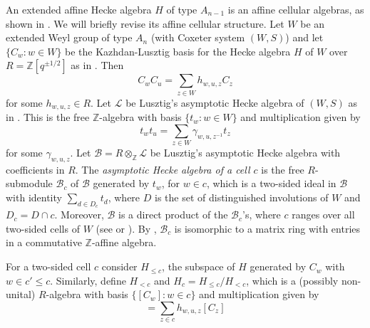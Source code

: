 \documentclass[oneside, a4paper, 11pt]{amsart}
\newcommand{\Z}{\mathbb{Z}}
\newcommand{\cB}{\mathcal{B}}
\newcommand\Warning{%
 \makebox[1.4em][c]{%
 \makebox[0pt][c]{\raisebox{.1em}{\small!}}%
 \makebox[0pt][c]{\color{red}\Large$\bigtriangleup$}}}%
\newcommand{\warning}[1]{{\Warning {\textbf{#1}}}}
\begin{document}
An extended affine Hecke algebra $H$ of type $A_{n-1}$ is an affine cellular algebras, as shown in 
\cite[Section 5]{KXaffine}. 
 We will briefly revise its affine cellular structure. Let $W$ be an extended Weyl group of type $A_n$ (with Coxeter system $(W,S)$) and let $\{C_w:w\in W\}$ be the Kazhdan-Lusztig basis for the Hecke algebra $H$ of $W$ over $R=\Z[q^{\pm 1/2}]$ as in \cite{KazhdanLusztig}. Then 
\begin{equation}
C_wC_u=\sum_{z\in W}h_{w,u,z}C_z
\end{equation}
for some $h_{w,u,z}\in R$.  Let ${\mathcal L}$ be Lusztig's asymptotic Hecke algebra of $(W,S)$ as in \cite{Lusztig2}. This is the free $\Z$-algebra with basis $\{t_w:w\in W\}$ and multiplication given by
\begin{equation}
t_wt_u=\sum_{z\in W} \gamma_{w,u,z^{-1}}t_z
\end{equation}
for some $\gamma_{w,u,z}$.
Let ${\cB}=R\otimes_{\Z} {\mathcal L}$ be Lusztig's asymptotic Hecke algebra with coefficients in $R$.  The \emph{asymptotic Hecke algebra of a cell $c$} is the free $R$-submodule $\cB_c$ of $\cB$ generated by $t_w$, for  $w\in c$, which is a two-sided ideal in $\cB$ with identity $\sum_{d\in D_c} t_d$, 
where $D$ is the set of distinguished involutions of $W$ and 
$D_c = D \cap c$.
Moreover, $\cB$ is a direct product of the $\cB_c$'s, where $c$ ranges over all two-sided cells of $W$ (see \cite[p.175]{KXaffine} or  \cite{Xi}).
By \cite[8.2]{Xi}, ${\cB}_c$ is isomorphic to a matrix ring with entries in a commutative $\Z$-affine algebra.

For a two-sided cell $c$ consider $H_{\leq c}$, the subspace of $H$ generated by $C_w$ with $w\in c' \leq c$. Similarly, define 
$H_{<c}$ and $H_c=H_{\leq c}/H_{<c}$, which is a (possibly non-unital) $R$-algebra with basis $\{[C_w]: w\in c\}$ and multiplication given by
\begin{equation}
[C_w][C_u]=\sum_{z\in c}h_{w,u,z}[C_z]
\end{equation}
\end{document}
